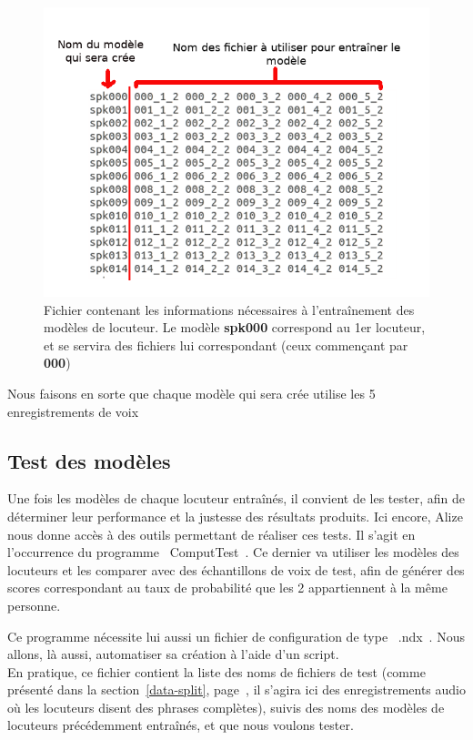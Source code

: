 \documentclass[a4paper, 12pt]{book}
\newcounter{program}[subsection]
\begin{document}
\begin{figure}[htbp]
  \centering
  \includegraphics[width=1\linewidth]{images/trainFile.png}
  \caption{Fichier contenant les informations nécessaires à l'entraînement des modèles de locuteur. Le modèle \textbf{spk000} correspond au 1er locuteur, et se servira des fichiers lui correspondant (ceux commençant par \textbf{000})}
\end{figure}

Nous faisons en sorte que chaque modèle qui sera crée utilise les 5 enregistrements de voix 

\subsection{Test des modèles}

Une fois les modèles de chaque locuteur entraînés, il convient de les tester, afin de déterminer leur performance et la justesse des résultats produits. Ici encore, Alize nous donne accès à des outils permettant de réaliser ces tests. Il s'agit en l'occurrence du programme \guillemotleft{}~ComputTest~\guillemotright{}. Ce dernier va utiliser les modèles des locuteurs et les comparer avec des échantillons de voix de test, afin de générer des scores correspondant au taux de probabilité que les 2 appartiennent à la même personne.

Ce programme nécessite lui aussi un fichier de configuration de type \guillemotleft{}~.ndx~\guillemotright{}. Nous allons, là aussi, automatiser sa création à l'aide d'un script.\\

En pratique, ce fichier contient la liste des noms de fichiers de test (comme présenté dans la section~\ref{data-split}, page~\pageref{data-split}, il s'agira ici des enregistrements audio où les locuteurs disent des phrases complètes), suivis des noms des modèles de locuteurs précédemment entraînés, et que nous voulons tester.
\end{document}
